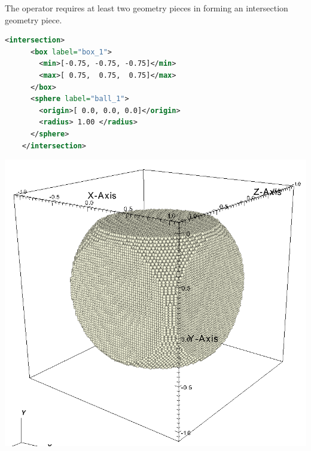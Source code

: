 \begin{minipage}{0.6\textwidth}
  The  operator requires at least two geometry
  pieces in forming an intersection geometry piece.  
  \begin{lstlisting}[language=XML]
    <intersection>
      <box label="box_1">
        <min>[-0.75, -0.75, -0.75]</min>
        <max>[ 0.75,  0.75,  0.75]</max>
      </box>
      <sphere label="ball_1">
        <origin>[ 0.0, 0.0, 0.0]</origin>
        <radius> 1.00 </radius>
      </sphere>
    </intersection>
  \end{lstlisting}
\end{minipage}
\begin{minipage}{0.4\textwidth}
  \centering
  \includegraphics[width=0.9\columnwidth]{FIGS/geometry/geom_intersect.png}
\end{minipage}

